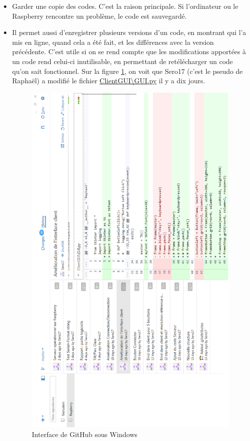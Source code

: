 \documentclass[12pt,a4paper]{report}
\begin{document}
\begin{itemize}
\item Garder une copie des codes. C'est la raison principale. Si l'ordinateur ou le Raspberry rencontre un problème, le code est sauvegardé.
\item Il permet aussi d'enregistrer plusieurs versions d'un code, en montrant qui l'a mis en ligne, quand cela a été fait, et les différences avec la version précédente. C'est utile si on se rend compte que les modifications apportées à un code rend celui-ci inutilisable, en permettant de retélécharger un code qu'on sait fonctionnel. Sur la figure \ref{GitHub}, on voit que Sero17 (c'est le pseudo de Raphaël) a modifié le fichier \url{ClientGUI\GUI.py} il y a dix jours.

\begin{figure}[hf!]
\center
\includegraphics[scale=0.7]{GitHub.png}
\caption{Interface de GitHub sous Windows}
\label{GitHub}
\end{figure}
\end{itemize}
\end{document}
